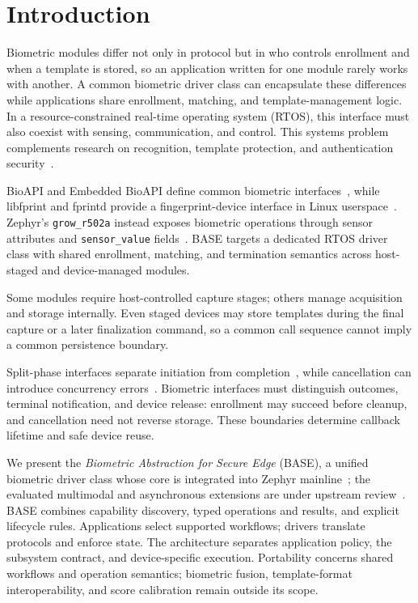 \section{Introduction}
\label{sec:introduction}

Biometric modules differ not only in protocol but in who controls enrollment and when a template is stored, so an application written for one module rarely works with another. A common biometric driver class can encapsulate these differences while applications share enrollment, matching, and template-management logic. In a resource-constrained real-time operating system (RTOS), this interface must also coexist with sensing, communication, and control. This systems problem complements research on recognition, template protection, and authentication security~\cite{yang2021biometric,ahvanooey2022modern}.

BioAPI and Embedded BioAPI define common biometric interfaces~\cite{iso19784,iso29164}, while libfprint and fprintd provide a fingerprint-device interface in Linux userspace~\cite{libfprint_device_api,fprintd_device_api}. Zephyr's \texttt{grow\_r502a} instead exposes biometric operations through sensor attributes and \texttt{sensor\_value} fields~\cite{zephyr_sensor_api,zephyr_r502a}. BASE targets a dedicated RTOS driver class with shared enrollment, matching, and termination semantics across host-staged and device-managed modules.

Some modules require host-controlled capture stages; others manage acquisition and storage internally. Even staged devices may store templates during the final capture or a later finalization command, so a common call sequence cannot imply a common persistence boundary.

Split-phase interfaces separate initiation from completion~\cite{gay2003nesc}, while cancellation can introduce concurrency errors~\cite{sethi2022cancellation}. Biometric interfaces must distinguish outcomes, terminal notification, and device release: enrollment may succeed before cleanup, and cancellation need not reverse storage. These boundaries determine callback lifetime and safe device reuse.

We present the \emph{Biometric Abstraction for Secure Edge} (BASE), a unified biometric driver class whose core is integrated into Zephyr mainline~\cite{zephyr_biometrics}; the evaluated multimodal and asynchronous extensions are under upstream review~\cite{zephyr_pr2}. BASE combines capability discovery, typed operations and results, and explicit lifecycle rules. Applications select supported workflows; drivers translate protocols and enforce state. The architecture separates application policy, the subsystem contract, and device-specific execution. Portability concerns shared workflows and operation semantics; biometric fusion, template-format interoperability, and score calibration remain outside its scope.

